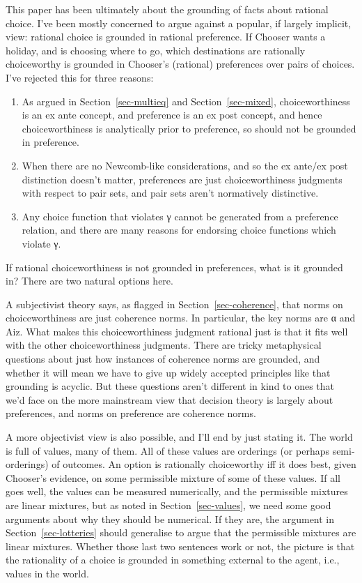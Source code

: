 \documentclass[
  11pt,
  letterpaper,
  DIV=11,
  numbers=noendperiod,
  twoside]{scrartcl}
\providecommand{\tightlist}{%
  \setlength{\itemsep}{0pt}\setlength{\parskip}{0pt}}
\begin{document}
This paper has been ultimately about the grounding of facts about
rational choice. I've been mostly concerned to argue against a popular,
if largely implicit, view: rational choice is grounded in rational
preference. If Chooser wants a holiday, and is choosing where to go,
which destinations are rationally choiceworthy is grounded in Chooser's
(rational) preferences over pairs of choices. I've rejected this for
three reasons:

\begin{enumerate}
\def\labelenumi{\arabic{enumi}.}
\tightlist
\item
  As argued in Section~\ref{sec-multieq} and Section~\ref{sec-mixed},
  choiceworthiness is an ex ante concept, and preference is an ex post
  concept, and hence choiceworthiness is analytically prior to
  preference, so should not be grounded in preference.
\item
  When there are no Newcomb-like considerations, and so the ex ante/ex
  post distinction doesn't matter, preferences are just choiceworthiness
  judgments with respect to pair sets, and pair sets aren't normatively
  distinctive.
\item
  Any choice function that violates γ cannot be generated from a
  preference relation, and there are many reasons for endorsing choice
  functions which violate γ.
\end{enumerate}

If rational choiceworthiness is not grounded in preferences, what is it
grounded in? There are two natural options here.

A subjectivist theory says, as flagged in Section~\ref{sec-coherence},
that norms on choiceworthiness are just coherence norms. In particular,
the key norms are α and Aiz. What makes this choiceworthiness judgment
rational just is that it fits well with the other choiceworthiness
judgments. There are tricky metaphysical questions about just how
instances of coherence norms are grounded, and whether it will mean we
have to give up widely accepted principles like that grounding is
acyclic. But these questions aren't different in kind to ones that we'd
face on the more mainstream view that decision theory is largely about
preferences, and norms on preference are coherence norms.

A more objectivist view is also possible, and I'll end by just stating
it. The world is full of values, many of them. All of these values are
orderings (or perhaps semi-orderings) of outcomes. An option is
rationally choiceworthy iff it does best, given Chooser's evidence, on
some permissible mixture of some of these values. If all goes well, the
values can be measured numerically, and the permissible mixtures are
linear mixtures, but as noted in Section~\ref{sec-values}, we need some
good arguments about why they should be numerical. If they are, the
argument in Section~\ref{sec-lotteries} should generalise to argue that
the permissible mixtures are linear mixtures. Whether those last two
sentences work or not, the picture is that the rationality of a choice
is grounded in something external to the agent, i.e., values in the
world.
\end{document}
